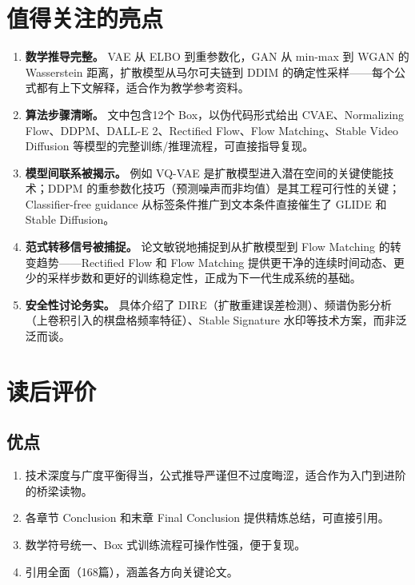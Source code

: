 \documentclass[11pt,a4paper]{ctexart}
\begin{document}
\section{值得关注的亮点}

\begin{enumerate}[leftmargin=*, itemsep=2pt]
    \item \textbf{数学推导完整。}
    VAE 从 ELBO 到重参数化，GAN 从 min-max 到 WGAN 的 Wasserstein 距离，扩散模型从马尔可夫链到 DDIM 的确定性采样——每个公式都有上下文解释，适合作为教学参考资料。

    \item \textbf{算法步骤清晰。}
    文中包含12个 Box，以伪代码形式给出 CVAE、Normalizing Flow、DDPM、DALL-E 2、Rectified Flow、Flow Matching、Stable Video Diffusion 等模型的完整训练/推理流程，可直接指导复现。

    \item \textbf{模型间联系被揭示。}
    例如 VQ-VAE 是扩散模型进入潜在空间的关键使能技术；DDPM 的重参数化技巧（预测噪声而非均值）是其工程可行性的关键；Classifier-free guidance 从标签条件推广到文本条件直接催生了 GLIDE 和 Stable Diffusion。

    \item \textbf{范式转移信号被捕捉。}
    论文敏锐地捕捉到从扩散模型到 Flow Matching 的转变趋势——Rectified Flow 和 Flow Matching 提供更干净的连续时间动态、更少的采样步数和更好的训练稳定性，正成为下一代生成系统的基础。

    \item \textbf{安全性讨论务实。}
    具体介绍了 DIRE（扩散重建误差检测）、频谱伪影分析（上卷积引入的棋盘格频率特征）、Stable Signature 水印等技术方案，而非泛泛而谈。
\end{enumerate}

\section{读后评价}

\subsection*{优点}

\begin{enumerate}[leftmargin=*, itemsep=1pt]
    \item 技术深度与广度平衡得当，公式推导严谨但不过度晦涩，适合作为入门到进阶的桥梁读物。
    \item 各章节 Conclusion 和末章 Final Conclusion 提供精炼总结，可直接引用。
    \item 数学符号统一、Box 式训练流程可操作性强，便于复现。
    \item 引用全面（168篇），涵盖各方向关键论文。
\end{enumerate}
\end{document}
